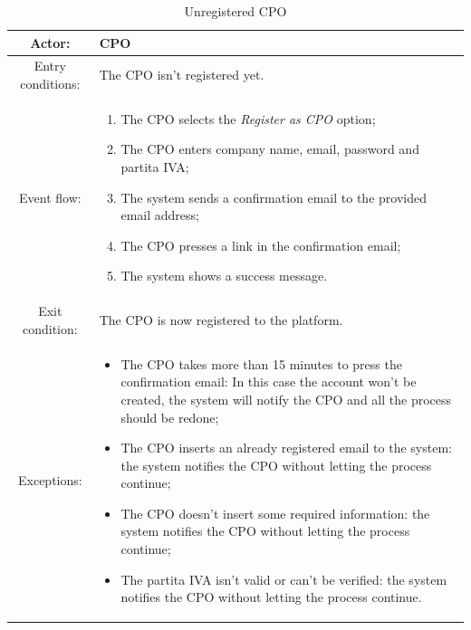 \begin{table}[h]
    \begin{center}
        \begin{tabular}{|c||p{10cm}|}
            \hline
            Actor:            & \ac{CPO}                                        \\
            \hline
            Entry conditions: & The \ac{CPO} isn't registered yet.              \\
            \hline
            Event flow:       &
            \begin{enumerate}
                \item The \ac{CPO} selects the \textit{Register as \ac{CPO}} option;
                \item The \ac{CPO} enters company name, email, password and \gls{partita IVA};
                \item The system sends a confirmation email to the provided email address;
                \item The \ac{CPO} presses a link in the confirmation email;
                \item The system shows a success message.
            \end{enumerate}
            \\
            \hline
            Exit condition:   & The \ac{CPO} is now registered to the platform. \\
            \hline
            Exceptions:       &
            \begin{itemize}
                \item The \ac{CPO} takes more than 15 minutes to press the confirmation email: In this case the account won't be created, the system will notify the \ac{CPO} and all the process should be redone;
                \item The \ac{CPO} inserts an already registered email to the system: the system notifies the \ac{CPO} without letting the process continue;
                \item The \ac{CPO} doesn't insert some required information: the system notifies the \ac{CPO} without letting the process continue;
                \item The \gls{partita IVA} isn't valid or can't be verified: the system notifies the \ac{CPO} without letting the process continue.
            \end{itemize}
            \\
            \hline
        \end{tabular}
    \end{center}
    \caption{Unregistered \ac{CPO}}
\end{table}

